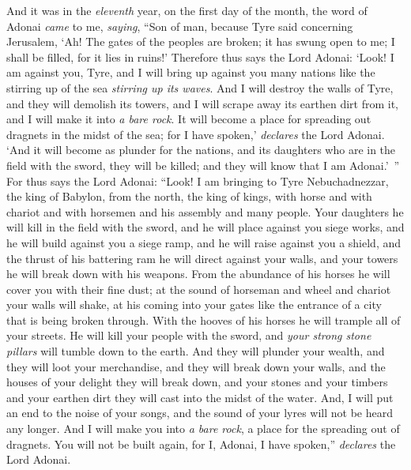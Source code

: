 \begin{biblechapter} %
 And it was in the \textit{eleventh} year, on the first day of the month, the word of Adonai \textit{came} to me, \textit{saying},
\verse “Son of man, because Tyre said concerning Jerusalem, ‘Ah! The gates of the peoples are broken; it has swung open to me; I shall be filled, for it lies in ruins!’
\verse Therefore thus says the Lord Adonai: ‘Look! I am against you, Tyre, and I will bring up against you many nations like the stirring up of the sea \textit{stirring up its waves}.
\verse And I will destroy the walls of Tyre, and they will demolish its towers, and I will scrape away its earthen dirt from it, and I will make it into \textit{a bare rock}.
\verse It will become a place for spreading out dragnets in the midst of the sea; for I have spoken,’ \textit{declares} the Lord Adonai. ‘And it will become as plunder for the nations,
\verse and its daughters who are in the field with the sword, they will be killed; and they will know that I am Adonai.’ ”
\verse For thus says the Lord Adonai: “Look! I am bringing to Tyre Nebuchadnezzar, the king of Babylon, from the north, the king of kings, with horse and with chariot and with horsemen and his assembly and many people.
\verse Your daughters he will kill in the field with the sword, and he will place against you siege works, and he will build against you a siege ramp, and he will raise against you a shield,
\verse and the thrust of his battering ram he will direct against your walls, and your towers he will break down with his weapons.
\verse From the abundance of his horses he will cover you with their fine dust; at the sound of horseman and wheel and chariot your walls will shake, at his coming into your gates like the entrance of a city that is being broken through.
\verse With the hooves of his horses he will trample all of your streets. He will kill your people with the sword, and \textit{your strong stone pillars} will tumble down to the earth.
\verse And they will plunder your wealth, and they will loot your merchandise, and they will break down your walls, and the houses of your delight they will break down, and your stones and your timbers and your earthen dirt they will cast into the midst of the water.
\verse And, I will put an end to the noise of your songs, and the sound of your lyres will not be heard any longer.
\verse And I will make you into \textit{a bare rock}, a place for the spreading out of dragnets. You will not be built again, for I, Adonai, I have spoken,” \textit{declares} the Lord Adonai.

\end{biblechapter}
